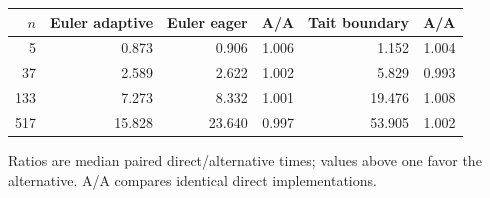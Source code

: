 \begin{center}\small
\begin{tabular}{@{}rrrrrr@{}}
\toprule
$n$ & Euler adaptive & Euler eager & A/A & Tait boundary & A/A \\
\midrule
5 & 0.873 & 0.906 & 1.006 & 1.152 & 1.004 \\
37 & 2.589 & 2.622 & 1.002 & 5.829 & 0.993 \\
133 & 7.273 & 8.332 & 1.001 & 19.476 & 1.008 \\
517 & 15.828 & 23.640 & 0.997 & 53.905 & 1.002 \\
\bottomrule
\end{tabular}
\end{center}
Ratios are median paired direct/alternative times; values above one favor the alternative. A/A compares identical direct implementations.
